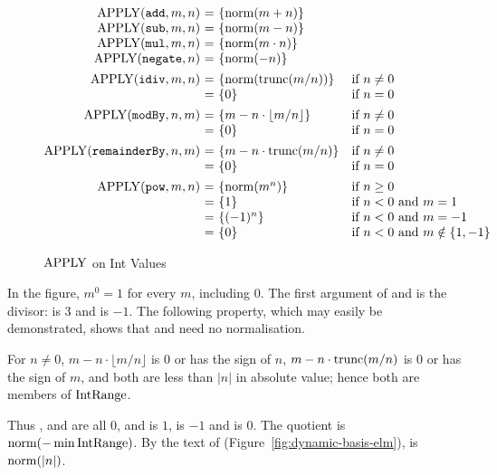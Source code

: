 \begin{figure}[htbp]
\centering
\small
\[
\begin{array}{@{}r@{\ }c@{\ }l@{\quad}l@{}}
\APPLY(\kw{add},m,n) & = & \{\norm(m+n)\} & \\
\APPLY(\kw{sub},m,n) & = & \{\norm(m-n)\} & \\
\APPLY(\kw{mul},m,n) & = & \{\norm(m\cdot n)\} & \\
\APPLY(\kw{negate},n) & = & \{\norm(-n)\} & \\[1ex]
\APPLY(\kw{idiv},m,n) & = & \{\norm(\dbtrunc(m/n))\} & \text{if}\ n\neq 0\\
                      & = & \{0\} & \text{if}\ n=0\\[1ex]
\APPLY(\kw{modBy},n,m) & = & \{m-n\cdot\lfloor m/n\rfloor\} & \text{if}\ n\neq 0\\
                       & = & \{0\} & \text{if}\ n=0\\[1ex]
\APPLY(\kw{remainderBy},n,m) & = & \{m-n\cdot\dbtrunc(m/n)\} & \text{if}\ n\neq 0\\
                             & = & \{0\} & \text{if}\ n=0\\[1ex]
\APPLY(\kw{pow},m,n) & = & \{\norm(m^{n})\} & \text{if}\ n\geq 0\\
                     & = & \{1\} & \text{if}\ n<0\ \text{and}\ m=1\\
                     & = & \{(-1)^{n}\} & \text{if}\ n<0\ \text{and}\ m=-1\\
                     & = & \{0\} & \text{if}\ n<0\ \text{and}\ m\notin\{1,-1\}
\end{array}
\]
\caption{$\mathrm{APPLY}$ on Int Values}\label{fig:dynamic-basis-int}
\end{figure}

In the figure, $m^{0}=1$ for every $m$, including $0$. The first argument of
 and  is the divisor:  is $3$ and
 is $-1$. The following property, which may easily be
demonstrated, shows that  and  need no
normalisation.
\begin{property}
For $n\neq 0$, $m-n\cdot\lfloor m/n\rfloor$ is $0$ or has the sign of $n$,
$m-n\cdot\mathrm{trunc}(m/n)$ is $0$ or has the sign of $m$, and both are less than
$|n|$ in absolute value; hence both are members of $\mathrm{IntRange}$.
\end{property}
Thus ,  and  are all $0$, and
 is $1$,  is $-1$
and  is $0$. %
The quotient  is $\mathrm{norm}(-\min\mathrm{IntRange})$. %
By the text of  (Figure~\ref{fig:dynamic-basis-elm}),  is
$\mathrm{norm}(|n|)$. %


